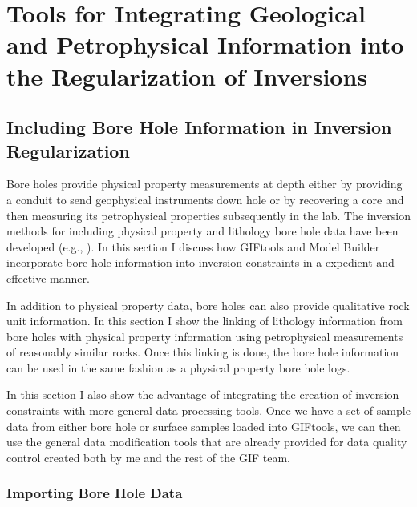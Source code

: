 



\chapter{Tools for Integrating Geological and Petrophysical Information into the Regularization of Inversions}
\label{ch:GIFtools}

\section{Including Bore Hole Information in Inversion Regularization}
\label{sec:BHandSS}
%
Bore holes provide physical property measurements at depth either by providing a conduit to send geophysical instruments down hole or by recovering a core and then measuring its petrophysical properties subsequently in the lab.  The inversion methods for including physical property and lithology bore hole data  have been developed (e.g., \cite{williams2008geologically}). In this section I discuss how GIFtools and Model Builder incorporate bore hole information into inversion constraints in a expedient and effective manner.

In addition to physical property data, bore holes can also provide qualitative rock unit information. In this section I show the linking of lithology information from bore holes with physical property information using petrophysical measurements of reasonably similar rocks. Once this linking is done, the bore hole information can be used in the same fashion as a physical property bore hole logs.

In this section I also show the advantage of integrating the creation of inversion constraints with more general data processing tools. Once we have a set of sample data from either bore hole or surface samples loaded into GIFtools, we can then use the general data modification tools that are already provided for data quality control created both by me and the rest of the \ac{GIF} team.

\subsection{Importing Bore Hole Data}
\label{subsec:importBH}


